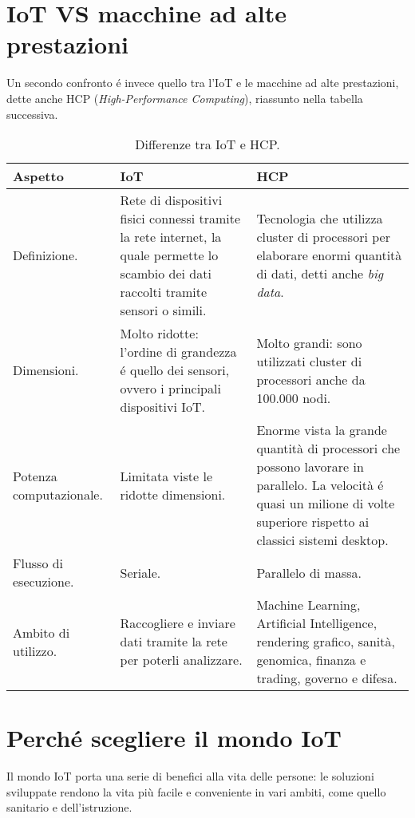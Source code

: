 \section{IoT VS macchine ad alte prestazioni}

Un secondo confronto é invece quello tra l'IoT e le macchine ad alte prestazioni, dette anche HCP (\textit{High-Performance Computing})\cite{hcp}, riassunto nella tabella successiva.

\begin{table}[H]
    \centering
	\begin{tabular}{|m{}<{\centering}||m{}<{\centering}|m{}<{\centering}|}
		\hline
		Aspetto & IoT & HCP \\
        \hline \hline
        Definizione. & Rete di dispositivi fisici connessi tramite la rete internet, la quale permette lo scambio dei dati raccolti tramite sensori o simili. & Tecnologia che utilizza cluster di processori per elaborare enormi quantità di dati, detti anche \textit{big data}. \\ 
        \hline
        Dimensioni. & Molto ridotte: l'ordine di grandezza é quello dei sensori, ovvero i principali dispositivi IoT. & Molto grandi: sono utilizzati cluster di processori anche da 100.000 nodi. \\
        \hline
        Potenza computazionale. & Limitata viste le ridotte dimensioni. & Enorme vista la grande quantità di processori che possono lavorare in parallelo. La velocità é quasi un milione di volte superiore rispetto ai classici sistemi desktop. \\
        \hline
        Flusso di esecuzione. & Seriale. & Parallelo di massa. \\
        \hline
        Ambito di utilizzo. & Raccogliere e inviare dati tramite la rete per poterli analizzare. & Machine Learning, Artificial Intelligence, rendering grafico, sanità, genomica, finanza e trading, governo e difesa. \\
		\hline
    \end{tabular}
    \caption{Differenze tra IoT e HCP.}
\end{table}

\section{Perché scegliere il mondo IoT}

Il mondo IoT porta una serie di benefici alla vita delle persone: le soluzioni sviluppate rendono la vita più facile e conveniente in vari ambiti, come quello sanitario e dell'istruzione. \\

